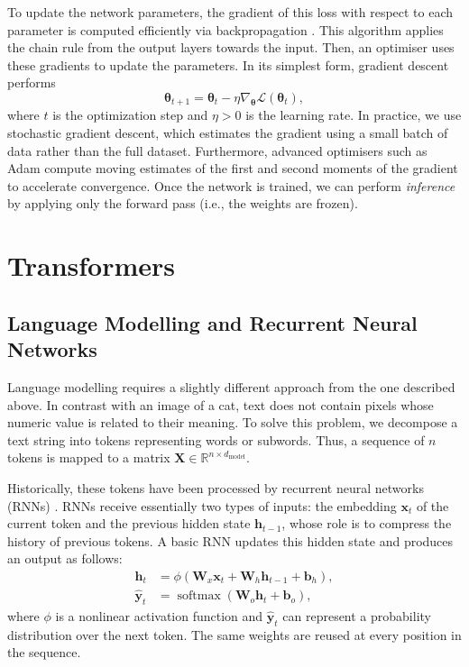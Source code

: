 To update the network parameters, the gradient of this loss with respect to each parameter is computed efficiently via backpropagation \citep{rumelhart1986backpropagation}. This algorithm applies the chain rule from the output layers towards the input. Then, an optimiser uses these gradients to update the parameters. In its simplest form, gradient descent performs
\begin{equation}
    \boldsymbol{\theta}_{t+1}
    = \boldsymbol{\theta}_{t} - \eta\nabla_{\boldsymbol{\theta}}
    \mathcal{L}(\boldsymbol{\theta}_{t}),
    \label{eq:gradient_descent}
\end{equation}
where $t$ is the optimization step and $\eta>0$ is the learning rate. In practice, we use stochastic gradient descent, which estimates the gradient using a small batch of data rather than the full dataset. Furthermore, advanced optimisers such as Adam \citep{Kingma2015adam} compute moving estimates of the first and second moments of the gradient to accelerate convergence. Once the network is trained, we can perform \textit{inference} by applying only the forward pass (i.e., the weights are frozen).

\section{Transformers}
\label{sec:transformers}

\subsection{Language Modelling and Recurrent Neural Networks}
\label{subsec:rnns}

Language modelling requires a slightly different approach from the one described above. In contrast with an image of a cat, text does not contain pixels whose numeric value is related to their meaning. To solve this problem, we decompose a text string into tokens representing words or subwords. Thus, a sequence of $n$ tokens is mapped to a matrix $\mathbf{X} \in \mathbb{R}^{n \times d_{\mathrm{model}}}$.

Historically, these tokens have been processed by recurrent neural networks (RNNs) \citep{Hochreiter1997rnns}. RNNs receive essentially two types of inputs: the embedding $\mathbf{x}_t$ of the current token and the previous hidden state $\mathbf{h}_{t-1}$, whose role is to compress the history of previous tokens. A basic RNN updates this hidden state and produces an output as follows:
\begin{align}
    \mathbf{h}_t
    &= \phi\!\left(\mathbf{W}_x\mathbf{x}_t
       + \mathbf{W}_h\mathbf{h}_{t-1} + \mathbf{b}_h\right), \\
    \hat{\mathbf{y}}_t
    &= \operatorname{softmax}\!\left(\mathbf{W}_o\mathbf{h}_t
       + \mathbf{b}_o\right),
    \label{eq:rnn_update}
\end{align}
where $\phi$ is a nonlinear activation function and $\hat{\mathbf{y}}_t$ can represent a probability distribution over the next token. The same weights are reused at every position in the sequence.

